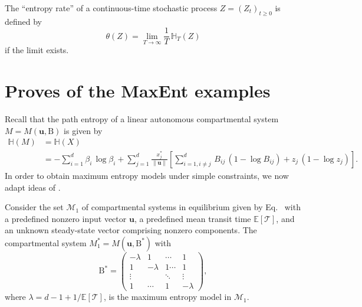 \documentclass[smallextended]{svjour3}
\makeatletter
\renewcommand*{\eqref}[1]{%
  \hyperref[{#1}]{\textup{\tagform@{\ref*{#1}}}}%
}
\renewcommand{\tens}[1]{\mathrm{#1}}
\renewcommand{\vec}[1]{\mathbf{#1}}
\newcommand{\E}{\mathbb{E}}
\newcommand{\TT}{\mathcal{T}}
\renewcommand{\H}{\mathbb{H}}
\newcommand{\suml}{\sum\limits}
\newcommand{\liml}{\lim\limits}
\newcommand{\vnorms}[1]{\|#1\|}
\renewcommand{\emph}[1]{``#1''}
\makeatother
\begin{document}
\begin{definition}%
	The \emph{entropy rate} of a continuous-time stochastic process $Z=(Z_t)_{t\geq0}$ is defined by
	\begin{equation}
		\theta(Z) = \liml_{T\to\infty} \frac{1}{T}\,\H_T(Z)
	\end{equation}
	if the limit exists.
\end{definition}


\section{Proves of the MaxEnt examples}
	Recall that the path entropy of a linear autonomous compartmental system $M=M(\vec{u},\tens{B})$ is given by
	\begin{equation}
    \begin{aligned}
      \H(M) &= \H(X)\\
      &= -\suml_{i=1}^d\beta_i\,\log\beta_i + \suml_{j=1}^d \frac{x^\ast_j}{\vnorms{\vec{u}}}\left[\suml_{i=1,i\neq j}^d \,B_{ij}\,(1-\log B_{ij}) + z_j\,(1-\log z_j)\right].
    \end{aligned}
	\end{equation}
	In order to obtain maximum entropy models under simple constraints, we now adapt ideas of \cite{Girardin2004MCAP}.

	\begin{myproposition}
    \label{proposition:max_ent_example_1}
		Consider the set $\mathcal{M}_1$ of compartmental systems in equilibrium given by Eq.~\eqref{eqn:lin_CS_sys}  with a predefined nonzero input vector $\vec{u}$, a predefined mean transit time $\E\left[\TT\right]$, and an unknown steady-state vector comprising nonzero components.
		The compartmental system $M^\ast_1=M(\vec{u},\tens{B}^\ast)$ with 
		\begin{equation}
			\tens{B}^\ast = \begin{pmatrix}
									-\lambda & 1 & \cdots & 1\\
									1 & -\lambda & 1 \cdots & 1 \\
									\vdots & & \ddots & \vdots\\
									1 & \cdots & 1 & -\lambda
             \end{pmatrix},
		\end{equation}
		where $\lambda=d-1+1/\E\left[\TT\right]$, 		
		is the maximum entropy model in $\mathcal{M}_1$.
	\end{myproposition}
\end{document}
